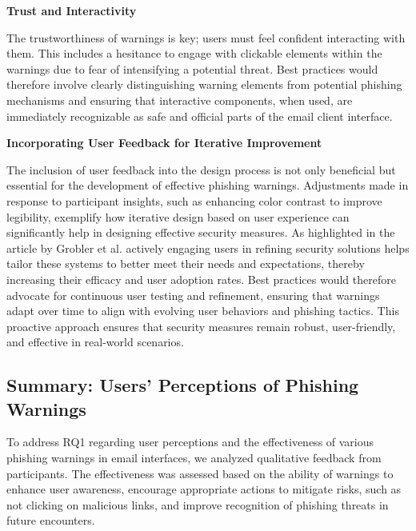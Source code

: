 \documentclass[
  a4paper,  %
  twoside,  %
  bibliography=totoc,
  headsepline,
  cleardoublepage=empty,
  parskip=half,
  draft=false
]{scrbook}
\begin{document}
\textbf{Trust and Interactivity}

The trustworthiness of warnings is key; users must feel confident interacting with them. This includes a hesitance to engage with clickable elements within the warnings due to fear of intensifying a potential threat. Best practices would therefore involve clearly distinguishing warning elements from potential phishing mechanisms and ensuring that interactive components, when used, are immediately recognizable as safe and official parts of the email client interface.

\textbf{Incorporating User Feedback for Iterative Improvement}

The inclusion of user feedback into the design process is not only beneficial but essential for the development of effective phishing warnings. Adjustments made in response to participant insights, such as enhancing color contrast to improve legibility, exemplify how iterative design based on user experience can significantly help in designing effective security measures. As highlighted in the article by Grobler et al. \cite{grobler} actively engaging users in refining security solutions helps tailor these systems to better meet their needs and expectations, thereby increasing their efficacy and user adoption rates. Best practices would therefore advocate for continuous user testing and refinement, ensuring that warnings adapt over time to align with evolving user behaviors and phishing tactics. This proactive approach ensures that security measures remain robust, user-friendly, and effective in real-world scenarios.

\subsection{Summary: Users’ Perceptions of Phishing Warnings}
To address RQ1 regarding user perceptions and the effectiveness of various phishing warnings in email interfaces, we analyzed qualitative feedback from participants. The effectiveness was assessed based on the ability of warnings to enhance user awareness, encourage appropriate actions to mitigate risks, such as not clicking on malicious links, and improve recognition of phishing threats in future encounters.
\end{document}
